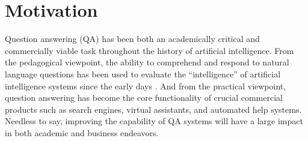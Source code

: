 \section{Motivation}
\label{sec:intro-motivation}



Question answering (QA) has been both an academically critical
and commercially viable task
throughout the history of artificial intelligence.
From the pedagogical viewpoint,
the ability to comprehend and respond to natural language questions
has been used to evaluate the ``intelligence''
of artificial intelligence systems
since the early days
\cite{turing1950computing,winograd1972language}.
And from the practical viewpoint,
question answering has become the core functionality of
crucial commercial products such as
search engines, virtual assistants,
and automated help systems.
Needless to say,
improving the capability of QA systems
will have a large impact in both academic and business endeavors.

